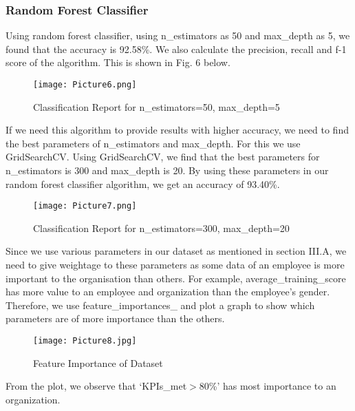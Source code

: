 \documentclass[11pt,conference]{IEEEtran}
\begin{document}
\subsubsection{Random Forest Classifier}

Using random forest classifier, using n\_estimators as 50 and max\_depth as 5, we found that the accuracy is 92.58\%. We also calculate the precision, recall and f-1 score of the algorithm. This is shown in Fig. 6 below. 

\begin{figure}[htbp]
\centerline{\texttt{[image: Picture6.png]}}
\caption{Classification Report for n\_estimators=50, max\_depth=5}
\label{fig}
\end{figure}

If we need this algorithm to provide results with higher accuracy, we need to find the best parameters of n\_estimators and max\_depth. For this we use GridSearchCV. Using GridSearchCV, we find that the best parameters for n\_estimators is 300 and max\_depth is 20. By using these parameters in our random forest classifier algorithm, we get an accuracy of 93.40\%.

\begin{figure}[htbp]
\centerline{\texttt{[image: Picture7.png]}}
\caption{Classification Report for n\_estimators=300, max\_depth=20}
\label{fig}
\end{figure}

Since we use various parameters in our dataset as mentioned in section III.A, we need to give weightage to these parameters as some data of an employee is more important to the organisation than others. For example, average\_training\_score has more value to an employee and organization than the employee’s gender. Therefore, we use feature\_importances\_ and plot a graph to show which parameters are of more importance than the others.

\begin{figure}[htbp]
\centerline{\texttt{[image: Picture8.jpg]}}
\caption{Feature Importance of Dataset}
\label{fig}
\end{figure}

From the plot, we observe that ‘KPIs\_met$>$80\%’ has most importance to an organization. \\
\end{document}
